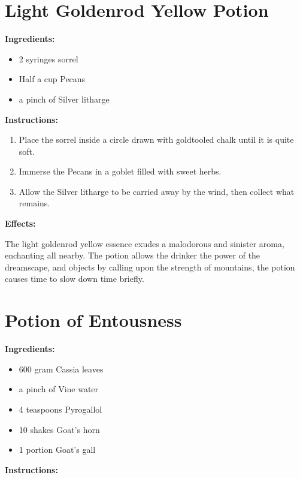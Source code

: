 \documentclass{article}
\begin{document}
\newpage
\section*{Light Goldenrod Yellow Potion}

\textbf{Ingredients:}

\begin{itemize}
  \item 2 syringes sorrel
  \item Half a cup Pecans
  \item a pinch of Silver litharge
\end{itemize}

\textbf{Instructions:}

\begin{enumerate}
  \item Place the sorrel inside a circle drawn with goldtooled chalk until it is quite soft.
  \item Immerse the Pecans in a goblet filled with sweet herbs.
  \item Allow the Silver litharge to be carried away by the wind, then collect what remains.
\end{enumerate}

\textbf{Effects:}

The light goldenrod yellow essence exudes a malodorous and sinister aroma, enchanting all nearby. The potion allows the drinker the power of the dreamscape, and objects by calling upon the strength of mountains, the potion causes time to slow down time briefly.

\newpage
\section*{Potion of Entousness}

\textbf{Ingredients:}

\begin{itemize}
  \item 600 gram Cassia leaves
  \item a pinch of Vine water
  \item 4 teaspoons Pyrogallol
  \item 10 shakes Goat's horn
  \item 1 portion Goat's gall
\end{itemize}

\textbf{Instructions:}
\end{document}

